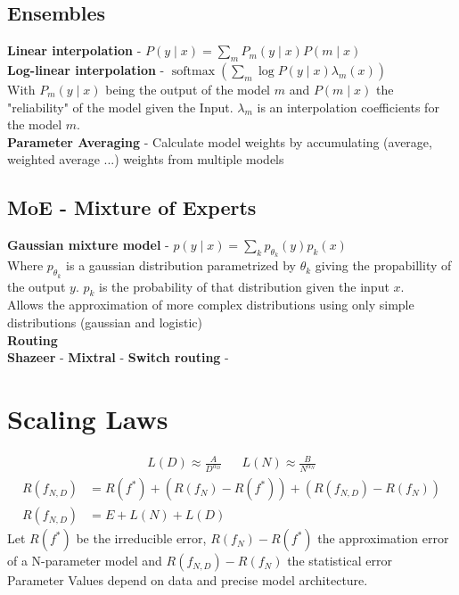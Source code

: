 \begin{multicols}{2}
\begin{mdframed}[style=eqbox]
        \subsection{Ensembles}
        \textbf{Linear interpolation} - $P(y \mid x) = \sum_m P_m(y \mid x) P(m \mid x)$\\
        \textbf{Log-linear interpolation} - $\operatorname{softmax}\left(\sum_m \log P(y \mid x) \lambda_m(x)\right)$\\
        {\tiny With $P_m(y \mid x)$ being the output of the model $m$ and $P(m \mid x)$ the "reliability" of the model given the Input. $\lambda_m$ is an interpolation coefficients for the model $m$.}\\
        \textbf{Parameter Averaging} - Calculate model weights by accumulating (average, weighted average ...) weights from multiple models
    \end{mdframed}
    \newpage

    \begin{mdframed}[style=eqbox]
        \subsection{MoE - Mixture of Experts}
        \textbf{Gaussian mixture model} - $p(y \mid x) = \sum_k p_{\theta_k}(y) p_k(x)$\\
        Where $p_{\theta_k}$ is a gaussian distribution parametrized by $\theta_k$ giving the propabillity of the output $y$. $p_k$ is the probability of that distribution given the input $x$.\\
        Allows the approximation of more complex distributions using only simple distributions (gaussian and logistic)\\[0.5em]
        \textbf{Routing}\\
        \textbf{Shazeer} -
        \textbf{Mixtral} -
        \textbf{Switch routing} -
    \end{mdframed}

    \section{Scaling Laws}
    \begin{mdframed}[style=eqbox]
        \begin{align*}
            L(D) \approx \frac{A}{D^{\alpha_D}} && L(N) \approx \frac{B}{N^{\alpha_N}}
        \end{align*}\vspace{-2em}
        \begin{align*}
            R(f_{N,D}) &= R(f^*) + (R(f_N) - R(f^*)) + (R(f_{N,D}) - R(f_N))\\
            R(f_{N,D}) &= E + L(N) + L(D)
        \end{align*}
        {\small
        Let $R(f^*)$ be the irreducible error, $R(f_N) - R(f^*)$ the approximation error of a N-parameter model and $R(f_{N,D}) - R(f_N)$ the statistical error\\
        Parameter Values depend on data and precise model architecture.
        }

\end{mdframed}
\end{multicols}
